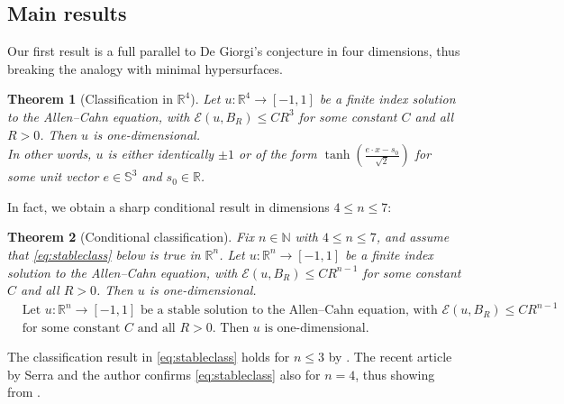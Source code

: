 \documentclass{article}
\newcommand{\N}{\mathbb{N}}
\newcommand{\R}{\mathbb{R}}
\newcommand{\Sp}{\mathbb{S}}
\newtheorem{theorem}{Theorem}[section]
\theoremstyle{definition}
\begin{document}
\subsection{Main results}\label{sec:mainres}
Our first result is a full parallel to De Giorgi's conjecture in four dimensions, thus breaking the analogy with minimal hypersurfaces.
\begin{theorem}[Classification in $\R^4$]\label{thm:R4indclass}
    Let $u:\R^4\to[-1,1]$ be a finite index solution to the Allen--Cahn equation, with $\mathcal E(u,B_R)\leq CR^3$ for some constant $C$ and all $R>0$. Then $u$ is one-dimensional.\\
     In other words, $u$ is either identically $\pm 1$ or of the form $\tanh\left(\frac{e\cdot x-s_0}{\sqrt{2}}\right)$ for some unit vector $e\in\Sp^{3}$ and $s_0\in\R$.
\end{theorem}
In fact, we obtain a sharp conditional result in dimensions $4\leq n \leq 7$:
\begin{theorem}[Conditional classification]\label{thm:finindclass}
    Fix $n\in\N$ with $4\leq n \leq 7$, and assume that \eqref{eq:stableclass} below is true in $\R^n$. Let $u:\R^n\to[-1,1]$ be a finite index solution to the Allen--Cahn equation, with $\mathcal E(u,B_R)\leq CR^{n-1}$ for some constant $C$ and all $R>0$. Then $u$ is one-dimensional.
    \begin{equation}\label{eq:stableclass}\tag{$\star$}
        \begin{aligned}
        &\text{Let } u:\mathbb{R}^n \to [-1,1] \text{ be a stable solution to the Allen--Cahn equation, with } \mathcal E(u,B_R)\leq CR^{n-1}\\
        & \text{for some constant }C\text{ and all }R>0. \text{ Then } u \text{ is one-dimensional.}
        \end{aligned}
    \end{equation}
\end{theorem}
The classification result in \eqref{eq:stableclass} holds for $n\leq 3$ by \cite{AAC01,AC00}. The recent article \cite{FSstable} by Serra and the author confirms \eqref{eq:stableclass} also for $n=4$, thus showing  from .\\
\end{document}
